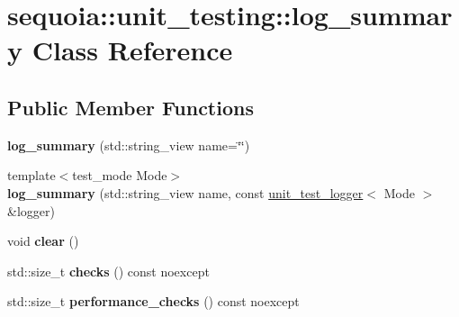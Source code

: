 \hypertarget{classsequoia_1_1unit__testing_1_1log__summary}{}\section{sequoia\+::unit\+\_\+testing\+::log\+\_\+summary Class Reference}
\label{classsequoia_1_1unit__testing_1_1log__summary}
\subsection*{Public Member Functions}
\begin{DoxyCompactItemize}
\item 
\mbox{\label{classsequoia_1_1unit__testing_1_1log__summary_aa67a3d1483f84b07ab3110a1ddf56c29}} 
{\bfseries log\+\_\+summary} (std\+::string\+\_\+view name=\char`\"{}\char`\"{})
\item 
\mbox{\label{classsequoia_1_1unit__testing_1_1log__summary_aa582de5d9726daaed4cc8fa40339d3c0}} 
{\footnotesize template$<$test\+\_\+mode Mode$>$ }\\{\bfseries log\+\_\+summary} (std\+::string\+\_\+view name, const \mbox{\hyperlink{classsequoia_1_1unit__testing_1_1unit__test__logger}{unit\+\_\+test\+\_\+logger}}$<$ Mode $>$ \&logger)
\item 
\mbox{\label{classsequoia_1_1unit__testing_1_1log__summary_a1b9d710d1e7bda30cda3219b600b7b08}} 
void {\bfseries clear} ()
\item 
\mbox{\label{classsequoia_1_1unit__testing_1_1log__summary_a0ec3a7138639d5b075b47fb2cd58f57e}} 
std\+::size\+\_\+t {\bfseries checks} () const noexcept
\item 
\mbox{\label{classsequoia_1_1unit__testing_1_1log__summary_ac4f4f36dce24b04f454c0b18a917e520}} 
std\+::size\+\_\+t {\bfseries performance\+\_\+checks} () const noexcept
\item 
\mbox{\label{classsequoia_1_1unit__testing_1_1log__summary_ab4ee42476adcec91f303689415d922ae}} 

\end{DoxyCompactItemize}
